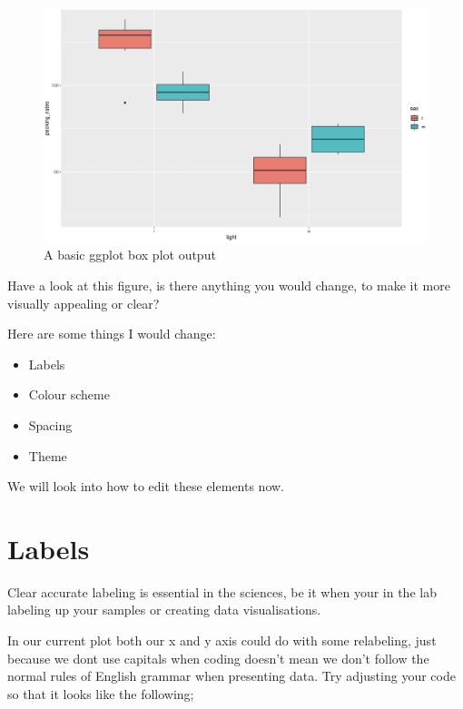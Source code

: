 \documentclass[
]{book}
\providecommand{\tightlist}{%
  \setlength{\itemsep}{0pt}\setlength{\parskip}{0pt}}
\begin{document}
\begin{figure}
\includegraphics[width=0.9\linewidth]{figures/pecking_rates_2} \caption{A basic ggplot box plot output}\label{fig:unnamed-chunk-79}
\end{figure}

Have a look at this figure, is there anything you would change, to make it more visually appealing or clear?

Here are some things I would change:

\begin{itemize}
\tightlist
\item
  Labels
\item
  Colour scheme
\item
  Spacing
\item
  Theme
\end{itemize}

We will look into how to edit these elements now.

\section{Labels}\label{labels}

Clear accurate labeling is essential in the sciences, be it when your in the lab labeling up your samples or creating data visualisations.

In our current plot both our x and y axis could do with some relabeling, just because we dont use capitals when coding doesn't mean we don't follow the normal rules of English grammar when presenting data. Try adjusting your code so that it looks like the following;
\end{document}
